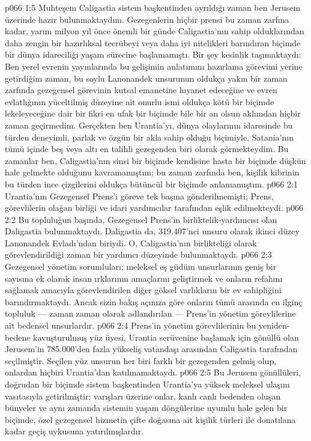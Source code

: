 \vs p066 1:5 Muhteşem Caligastia sistem başkentinden ayrıldığı zaman ben Jerusem üzerinde hazır bulunmaktaydım. Gezegenlerin hiçbir prensi bu zaman zarfına kadar, yarım milyon yıl önce önemli bir günde Caligastia’nın sahip olduklarından daha zengin bir hazırlıksal tecrübeyi veya daha iyi nitelikleri barındıran biçimde bir dünya idareciliği yaşam sürecine başlamamıştı. Bir şey kesinlik taşımaktaydı: Ben yerel evrenin yayınlarında bu gelişimin anlatımını hazırlama görevimi yerine getirdiğim zaman, bu soylu Lanonandek unsurunun oldukça yakın bir zaman zarfında gezegensel görevinin kutsal emanetine hıyanet edeceğine ve evren evlatlığının yüceltilmiş düzeyine ait onurlu ismi oldukça kötü bir biçimde lekeleyeceğine dair bir fikri en ufak bir biçimde bile bir an olsun aklımdan hiçbir zaman geçirmedim. Gerçekten ben Urantia’yı, dünya olaylarının idaresinde bu türden deneyimli, parlak ve özgün bir akla sahip olduğu biçimiyle, Satania’nın tümü içinde beş veya altı en talihli gezegenden biri olarak görmekteydim. Bu zamanlar ben, Caligastia’nın sinsi bir biçimde kendisine hasta bir biçimde düşkün hale gelmekte olduğunu kavramamıştım; bu zaman zarfında ben, kişilik kibrinin bu türden ince çizgilerini oldukça bütüncül bir biçimde anlamamıştım.
\vs p066 2:1 Urantia’nın Gezegensel Prens’i göreve tek başına gönderilmemişti; Prens, görevlilerin olağan birliği ve idari yardımcılar tarafından eşlik edilmekteydi.
\vs p066 2:2 Bu topluluğun başında, Gezegensel Prens’in birliktelik\hyp{}yardımcısı olan Daligastia bulunmaktaydı. Daligastia da, 319.407’nci unsuru olarak ikinci düzey Lanonandek Evladı’ndan biriydi. O, Caligastia’nın birlikteliği olarak görevlendirildiği zaman bir yardımcı düzeyinde bulunmaktaydı.
\vs p066 2:3 Gezegensel yönetim sorumluları; meleksel eş güdüm unsurlarının geniş bir sayısına ek olarak insan ırklarının amaçlarını geliştirmek ve onların refahını sağlamak amacıyla görevlendirilen diğer göksel varlıkların bir ev sahipliğini barındırmaktaydı. Ancak sizin bakış açınıza göre onların tümü arasında en ilginç topluluk --- zaman zaman  olarak adlandırılan --- Prens’in yönetim görevlilerine ait bedensel unsurlardır.
\vs p066 2:4 Prens’in yönetim görevlilerinin bu yeniden\hyp{}bedene kavuşturulmuş yüz üyesi, Urantia serüvenine başlamak için gönüllü olan Jerusem’in 785.000’den fazla yükseliş vatandaşı arasından Caligastia tarafından seçilmiştir. Seçilen yüz unsurun her biri farklı bir gezegenden gelmiş olup, onlardan hiçbiri Urantia’dan katılmamaktaydı.
\vs p066 2:5 Bu Jerusem gönüllüleri, doğrudan bir biçimde sistem başkentinden Urantia’ya yüksek meleksel ulaşım vasıtasıyla getirilmiştir; varışları üzerine onlar, kanlı canlı bedenden oluşan bünyeler ve aynı zamanda sistemin yaşam döngülerine uyumlu hale gelen bir biçimde, özel gezegensel hizmetin çifte doğasına ait kişilik türleri ile donatılana kadar geçiş uykusuna yatırılmışlardır.
